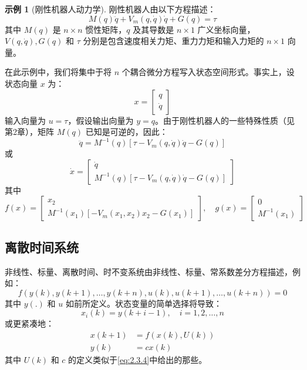 \documentclass[UTF8,12pt,a4paper]{ctexart}
\theoremstyle{definition}
\newtheorem{example}{示例}[section]
\begin{document}
\begin{example}[刚性机器人动力学]
刚性机器人由以下方程描述：
\[
M(q)\ddot{q} + V_m(q, \dot{q})\dot{q} + G(q) = \tau
\]
其中 $M(q)$ 是 $n \times n$ 惯性矩阵，$q$ 及其导数是 $n \times 1$ 广义坐标向量，$V(q, \dot{q}), G(q)$ 和 $\tau$ 分别是包含速度相关力矩、重力力矩和输入力矩的 $n \times 1$ 向量。

在此示例中，我们将集中于将 $n$ 个耦合微分方程写入状态空间形式。事实上，设状态向量 $x$ 为：
\[
x = \begin{bmatrix} q \\ \dot{q} \end{bmatrix}
\]
输入向量为 $u=\tau$，假设输出向量为 $y=q$。由于刚性机器人的一些特殊性质（见第2章），矩阵 $M(q)$ 已知是可逆的，因此：
\[
\ddot{q} = M^{-1}(q)[\tau - V_m(q,\dot{q})\dot{q} - G(q)]
\]
或
\[
\dot{x} = \begin{bmatrix} \dot{q} \\ M^{-1}(q)[\tau - V_m(q,\dot{q})\dot{q} - G(q)] \end{bmatrix}
\]
其中
\[
f(x) = \begin{bmatrix} x_2 \\ M^{-1}(x_1)[-V_m(x_1,x_2)x_2 - G(x_1)] \end{bmatrix}, \quad g(x) = \begin{bmatrix} 0 \\ M^{-1}(x_1) \end{bmatrix}
\]
\end{example}

\subsection{离散时间系统}

非线性、标量、离散时间、时不变系统由非线性、标量、常系数差分方程描述，例如：
\begin{equation}\label{eq:2.3.6}
f(y(k), y(k+1), \ldots, y(k+n), u(k), u(k+1), \ldots, u(k+n)) = 0
\end{equation}
其中 $y(.)$ 和 $u$ 如前所定义。状态变量的简单选择将导致：
\begin{equation}\label{eq:2.3.7}
x_i(k) = y(k+i-1), \quad i=1,2,\ldots,n
\end{equation}
或更紧凑地：
\begin{equation}\label{eq:2.3.8}
\begin{aligned}
x(k+1) &= f(x(k), U(k)) \\
y(k) &= cx(k)
\end{aligned}
\end{equation}
其中 $U(k)$ 和 $c$ 的定义类似于\eqref{eq:2.3.4}中给出的那些。
\end{document}
